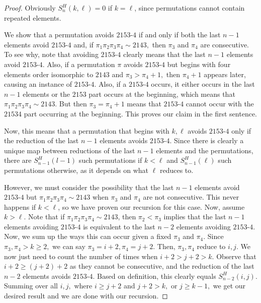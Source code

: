 \documentclass[11pt]{amsart}
\theoremstyle{definition}
\begin{document}
\begin{proof}
	Obviously $S_n^H(k, \ell) = 0$ if $k = \ell$, since
	permutations cannot contain repeated elements.

	We show that a permutation avoids $2153{\text{-}}4$ if and only if both the last $n-1$ elements avoid $2153{\text{-}}4$ and, if $\pi_1\pi_2\pi_3\pi_4 \sim 2143,$ then $\pi_3$ and $\pi_4$ are consecutive.  To see why, note that avoiding $2153{\text{-}}4$ clearly means that the last $n-1$ elements avoid $2153{\text{-}}4$.  Also, if a permutation $\pi$ avoids $2153{\text{-}}4$ but begins with four elements order isomorphic to $2143$ and $\pi_3 > \pi_4+1,$ then $\pi_4+1$ appears later, causing an instance of $2153{\text{-}}4.$  Also, if a $2153{\text{-}}4$ occurs, it either occurs in the last $n-1$ elements or the $2153$ part occurs at the beginning, which means that $\pi_1\pi_2\pi_3\pi_4 \sim 2143.$  But then $\pi_3 = \pi_4+1$ means that $2153{\text{-}}4$ cannot occur with the $21534$ part occurring at the beginning.  This proves our claim in the first sentence.
    
    Now, this means that a permutation that begins with $k, \ell$ avoids $2153{\text{-}}4$ only if the reduction of the last $n-1$ elements avoids $2153{\text{-}}4.$  Since there is clearly a unique map between reductions of the last $n-1$ elements and the permutations, there are $S_{n-1}^H(l-1)$ such permutations if $k<\ell$ and $S_{n-1}^H(\ell)$ such permutations otherwise, as it depends on what $\ell$ reduces to.
    
    However, we must consider the possibility that the last $n-1$ elements avoid $2153{\text{-}}4$ but $\pi_1\pi_2\pi_3\pi_4 \sim2143$ when $\pi_3$ and $\pi_4$ are not consecutive.  This never happens if $k < \ell$, so we have proven our recursion for this case.  Now, assume $k > \ell.$  Note that if $\pi_1\pi_2\pi_3\pi_4 \sim 2143$, then $\pi_2 < \pi_3$ implies that the last $n-1$ elements avoiding $2153{\text{-}}4$ is equivalent to the last $n-2$ elements avoiding $2153{\text{-}}4.$ Now, we sum up the ways this can occur given a fixed $\pi_3$ and $\pi_4.$  Since $\pi_3, \pi_4 > k \ge 2,$ we can say $\pi_3 = i+2, \pi_4 = j+2.$  Then, $\pi_3, \pi_4$ reduce to $i, j$.  We now just need to count the number of times when $i+2 > j+2 > k$. Observe that $i+2 \ge (j+2)+2$ as they cannot be consecutive, and the reduction of the last $n-2$ elements avoids $2153{\text{-}}4.$  Based on definition, this clearly equals $S_{n-2}^H(i, j).$  Summing over all $i, j,$ where $i \ge j+2$ and $j+2 > k,$ or $j \ge k-1,$ we get our desired result and we are done with our recursion.
\end{proof}
\end{document}
